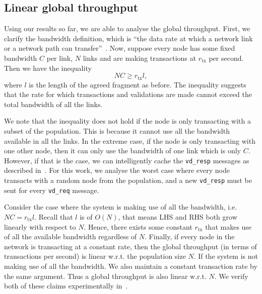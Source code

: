 \subsection{Linear global throughput}
\label{sec:global-throughput}
Using our results so far, we are able to analyse the global throughput.
First, we clarify the bandwidth definition, which is ``the data rate at which a network link or a network path can transfer''~\cite{prasad2003bandwidth}.
Now, suppose every node has some fixed bandwidth $C$ per link, $N$ links and are making transactions at $r_{\text{tx}}$ per second.
Then we have the inequality
$$NC \ge r_{\text{tx}} l,$$
where $l$ is the length of the agreed fragment as before.
The inequality suggests that the rate for which transactions and validations are made cannot exceed the total bandwidth of all the links.

We note that the inequality does not hold if the node is only transacting with a subset of the population.
This is because it cannot use all the bandwidth available in all the links.
In the extreme case, if the node is only transacting with one other node, then it can only use the bandwidth of one link which is only $C$.
However, if that is the case, we can intelligently cache the \texttt{vd\_resp} messages as described in~.
For this work, we analyse the worst case where every node transacts with a random node from the population,
and a new \texttt{vd\_resp} must be sent for every \texttt{vd\_req} message.

Consider the case where the system is making use of all the bandwidth, i.e. $NC = r_{\text{tx}} l$.
Recall that $l$ is of $O(N)$, that means LHS and RHS both grow linearly with respect to $N$.
Hence, there exists some constant $r_\text{tx}$ that makes use of all the available bandwidth regardless of $N$.
Finally, if every node in the network is transacting at a constant rate, then the global throughput (in terms of transactions per second) is linear w.r.t. the population size $N$.
If the system is not making use of all the bandwidth.
We also maintain a constant transaction rate by the same argument.
Thus a global throughput is also linear w.r.t. $N$.
We verify both of these claims experimentally in~.


